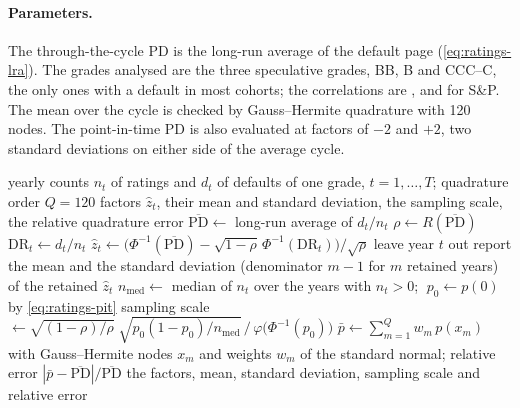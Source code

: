 \paragraph{Parameters.} The through-the-cycle PD is the long-run average of the default page (\cref{eq:ratings-lra}). The grades analysed are the three speculative grades, BB, B and CCC--C, the only ones with a default in most cohorts; the correlations are \rtgZSpBBRho{}, \rtgZSpBRho{} and \rtgZSpCCCCRho{} for S\&P. The mean over the cycle is checked by Gauss--Hermite quadrature with 120 nodes. The point-in-time PD is also evaluated at factors of $-2$ and $+2$, two standard deviations on either side of the average cycle.

\begin{algorithm}[htbp]
\caption{Implied credit-cycle factor of a grade, its sampling scale and the quadrature check.}
\label{alg:ratings-cycle}
\begin{algorithmic}[1]
\Require yearly counts $n_t$ of ratings and $d_t$ of defaults of one grade, $t=1,\dots,T$; quadrature order $Q=120$
\Ensure factors $\hat z_t$, their mean and standard deviation, the sampling scale, the relative quadrature error
\State $\overline{\mathrm{PD}}\gets$ long-run average of $d_t/n_t$ 
\State $\rho\gets R(\overline{\mathrm{PD}})$ 
  \State $\mathrm{DR}_t\gets d_t/n_t$
   \State $\hat z_t\gets\bigl(\Phi^{-1}(\overline{\mathrm{PD}})-\sqrt{1-\rho}\,\Phi^{-1}(\mathrm{DR}_t)\bigr)/\sqrt{\rho}$ 
  \Else \State leave year $t$ out \EndIf
\EndFor
\State report the mean and the standard deviation (denominator $m-1$ for $m$ retained years) of the retained $\hat z_t$
\State $n_{\mathrm{med}}\gets$ median of $n_t$ over the years with $n_t>0$; $\;p_0\gets p(0)$ by \cref{eq:ratings-pit}
\State sampling scale $\gets\sqrt{(1-\rho)/\rho}\;\sqrt{p_0(1-p_0)/n_{\mathrm{med}}}\,/\,\varphi\bigl(\Phi^{-1}(p_0)\bigr)$ 
\State $\bar p\gets\sum_{m=1}^{Q}w_m\,p(x_m)$ with Gauss--Hermite nodes $x_m$ and weights $w_m$ of the standard normal; relative error $|\bar p-\overline{\mathrm{PD}}|/\overline{\mathrm{PD}}$
\State \Return the factors, mean, standard deviation, sampling scale and relative error
\end{algorithmic}
\end{algorithm}

